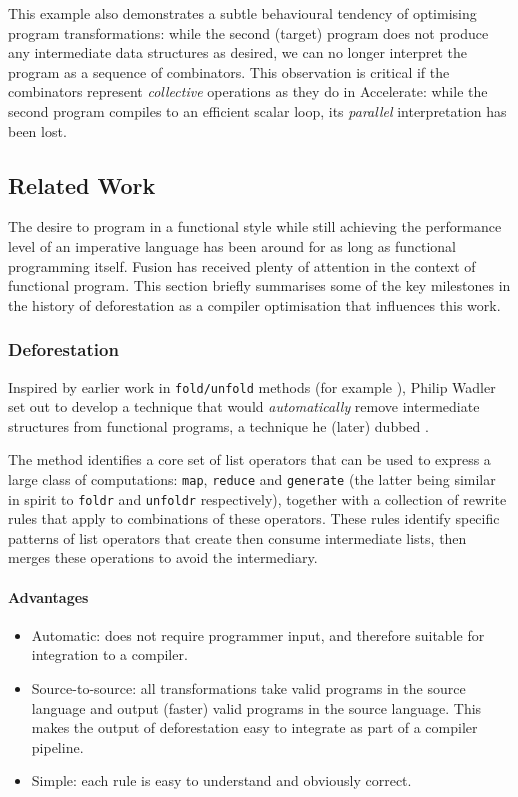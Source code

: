 This example also demonstrates a subtle behavioural tendency of optimising
program transformations: while the second (target) program does not produce any
intermediate data structures as desired, we can no longer interpret the program
as a sequence of combinators. This observation is critical if the combinators
represent \emph{collective} operations as they do in Accelerate: while the
second program compiles to an efficient scalar loop, its \emph{parallel}
interpretation has been lost.


\subsection{Related Work}

The desire to program in a functional style while still achieving the
performance level of an imperative language has been around for as long as
functional programming itself. Fusion has received plenty of attention in the
context of functional program. This section briefly summarises some of the key
milestones in the history of deforestation as a compiler optimisation that
influences this work.

\subsubsection{Deforestation}

Inspired by earlier work in \texttt{fold/unfold} methods (for example
\citet{Burstall:1977kl}), Philip Wadler set out to develop a technique that
would \emph{automatically} remove intermediate structures from functional
programs, a technique he (later) dubbed 
\cite{Wadler:1981hy,Wadler:1990ix}.

The method identifies a core set of list operators that can be used to express a
large class of computations: \texttt{map}, \texttt{reduce} and
\texttt{generate} (the latter being similar in spirit to \texttt{foldr} and
\texttt{unfoldr} respectively), together with a collection of rewrite rules that
apply to combinations of these operators. These rules identify specific patterns
of list operators that create then consume intermediate lists, then merges these
operations to avoid the intermediary.

\paragraph{Advantages}
\begin{itemize}
    \item Automatic: does not require programmer input, and therefore suitable
        for integration to a compiler.

    \item Source-to-source: all transformations take valid programs in the
        source language and output (faster) valid programs in the source
        language. This makes the output of deforestation easy to integrate as
        part of a compiler pipeline.

    \item Simple: each rule is easy to understand and obviously correct.
\end{itemize}


